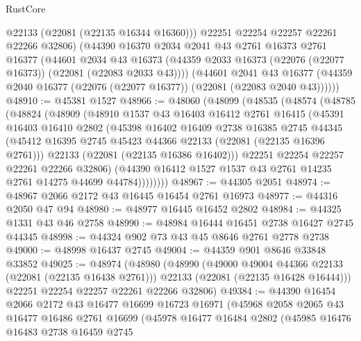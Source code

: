 \begin{lexlean}{RustCore}
\begin{coremodule}
          @22133
          (@22081 (@22135 @16344 @16360)))
        @22251
        @22254
        @22257
        @22261
        @22266
        @32806)
      (@44390
        @16370
        @2034
        @2041
        @43
        @2761
        @16373
        @2761
        @16377
        (@44601
          @2034
          @43
          @16373
          (@44359 @2033 @16373 (@22076 (@22077 @16373)) (@22081 (@22083 @2033 @43))))
        (@44601
          @2041
          @43
          @16377
          (@44359 @2040 @16377 (@22076 (@22077 @16377)) (@22081 (@22083 @2040 @43))))))
@48910 := @45381 @1527
@48966 := @48060
    (@48099
      (@48535
        (@48574
          (@48785
            (@48824
              (@48909
                (@48910
                  @1537
                  @43
                  @16403
                  @16412
                  @2761
                  @16415
                  (@45391
                    @16403
                    @16410
                    @2802
                    (@45398
                      @16402
                      @16409
                      @2738
                      @16385
                      @2745
                      @44345
                      (@45412 @16395 @2745 @45423 @44366 @22133 (@22081 (@22135 @16396 @2761)))
                      @22133
                      (@22081 (@22135 @16386 @16402)))
                    @22251
                    @22254
                    @22257
                    @22261
                    @22266
                    @32806)
                  (@44390 @16412 @1527 @1537 @43 @2761 @14235 @2761 @14275 @44699 @44784))))))))
@48967 := @44305 @2051
@48974 := @48967 @2066 @2172 @43 @16445 @16454 @2761 @16973
@48977 := @44316 @2050 @47 @94
@48980 := @48977 @16445 @16452 @2802
@48984 := @44325 @1331 @43 @46 @2758
@48990 := @48984 @16444 @16451 @2738 @16427 @2745 @44345
@48998 := @44324 @902 @73 @43 @45 @8646 @2761 @2778 @2738
@49000 := @48998 @16437 @2745
@49004 := @44359 @901 @8646 @33848 @33852
@49025 := @48974
    (@48980
      (@48990
        (@49000 @49004 @44366 @22133 (@22081 (@22135 @16438 @2761)))
        @22133
        (@22081 (@22135 @16428 @16444)))
      @22251
      @22254
      @22257
      @22261
      @22266
      @32806)
@49384 := @44390
    @16454
    @2066
    @2172
    @43
    @16477
    @16699
    @16723
    @16971
    (@45968
      @2058
      @2065
      @43
      @16477
      @16486
      @2761
      @16699
      (@45978
        @16477
        @16484
        @2802
        (@45985
          @16476
          @16483
          @2738
          @16459
          @2745

\end{coremodule}
\end{lexlean}
